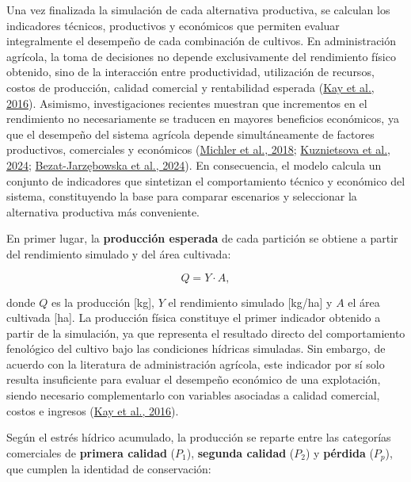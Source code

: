 \documentclass[12pt]{report}
\newcommand{\citeref}[2]{\hyperlink{ref:#1}{#2}}
\begin{document}
Una vez finalizada la simulación de cada alternativa productiva, se calculan los indicadores técnicos, productivos y económicos que permiten evaluar integralmente el desempeño de cada combinación de cultivos. En administración agrícola, la toma de decisiones no depende exclusivamente del rendimiento físico obtenido, sino de la interacción entre productividad, utilización de recursos, costos de producción, calidad comercial y rentabilidad esperada (\citeref{kay2019}{Kay et al., 2016}). Asimismo, investigaciones recientes muestran que incrementos en el rendimiento no necesariamente se traducen en mayores beneficios económicos, ya que el desempeño del sistema agrícola depende simultáneamente de factores productivos, comerciales y económicos (\citeref{michler2019}{Michler et al., 2018}; \citeref{kuznietsova2024}{Kuznietsova et al., 2024}; \citeref{bezat2024}{Bezat-Jarzębowska et al., 2024}). En consecuencia, el modelo calcula un conjunto de indicadores que sintetizan el comportamiento técnico y económico del sistema, constituyendo la base para comparar escenarios y seleccionar la alternativa productiva más conveniente.

\vspace{0.2cm}

En primer lugar, la \textbf{producción esperada} de cada partición se obtiene a partir del rendimiento simulado y del área cultivada:

\vspace{0.2cm}

\begin{equation}
Q = Y \cdot A,
\end{equation}

\vspace{0.2cm}

donde $Q$ es la producción [kg], $Y$ el rendimiento simulado [kg/ha] y $A$ el área cultivada [ha]. La producción física constituye el primer indicador obtenido a partir de la simulación, ya que representa el resultado directo del comportamiento fenológico del cultivo bajo las condiciones hídricas simuladas. Sin embargo, de acuerdo con la literatura de administración agrícola, este indicador por sí solo resulta insuficiente para evaluar el desempeño económico de una explotación, siendo necesario complementarlo con variables asociadas a calidad comercial, costos e ingresos (\citeref{kay2019}{Kay et al., 2016}).

\vspace{0.2cm}

Según el estrés hídrico acumulado, la producción se reparte entre las categorías comerciales de \textbf{primera calidad} ($P_1$), \textbf{segunda calidad} ($P_2$) y \textbf{pérdida} ($P_p$), que cumplen la identidad de conservación:
\end{document}
